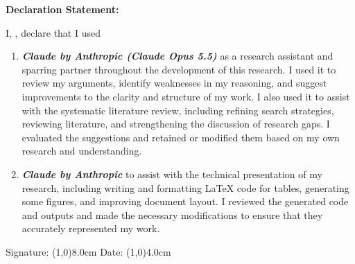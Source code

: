 \textbf{Declaration Statement:}

I, \theStudentName, declare that I used

\begin{enumerate}[label=\roman*.]

\item \textit{\textbf{Claude by Anthropic (Claude Opus 5.5)}} as a research assistant and sparring partner throughout the development of this research. I used it to review my arguments, identify weaknesses in my reasoning, and suggest improvements to the clarity and structure of my work. I also used it to assist with the systematic literature review, including refining search strategies, reviewing literature, and strengthening the discussion of research gaps. I evaluated the suggestions and retained or modified them based on my own research and understanding.

\item \textit{\textbf{Claude by Anthropic}} to assist with the technical presentation of my research, including writing and formatting LaTeX code for tables, generating some figures, and improving document layout. I reviewed the generated code and outputs and made the necessary modifications to ensure that they accurately represented my work.

\end{enumerate}


\vspace{1cm}

Signature: \line(1,0){8.0cm}
Date:	\line(1,0){4.0cm}\par
